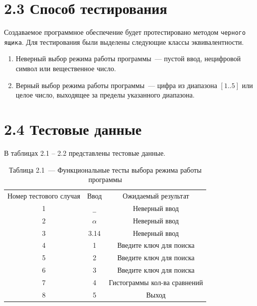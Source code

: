 \documentclass[12pt, a4paper]{report}
\begin{document}
	\section*{2.3 Способ тестирования}
	
	Создаваемое программное обеспечение будет протестировано методом \verb|черного ящика|. Для тестирования были выделены следующие классы эквивалентности.
	\begin{enumerate}
		\item Неверный выбор режима работы программы~--- пустой ввод, нецифровой символ или вещественное число.
		\item Верный выбор режима работы программы~--- цифра из диапазона $[1..5]$ или целое число, выходящее за пределы указанного диапазона.
	\end{enumerate}
	
	\section*{2.4 Тестовые данные}
	
	В таблицах 2.1 -- 2.2 представлены тестовые данные.
	
	\begin{table} [H]
		\caption*{Таблица 2.1~--- Функциональные тесты выбора режима работы программы}
		\begin{tabular}[l]{|c c c|}
			\hline
			Номер тестового случая & Ввод & Ожидаемый результат  \\
			
			1 & \verb|_|\tablefootnote[1]{Пустой ввод} & Неверный ввод \\\hline 
			
			2 & $\alpha$ & Неверный ввод \\\hline
			
			3 & 3.14 & Неверный ввод \\\hline
			
			4 & 1 & Введите ключ для поиска \\\hline 
			
			5 & 2 & Введите ключ для поиска \\\hline
			
			6 & 3 & Введите ключ для поиска \\\hline
			
			7 & 4 & Гистограммы кол-ва сравнений \\\hline
			
			8 & 5 & Выход \\\hline
		\end{tabular}
	\end{table}
	
\end{document}

